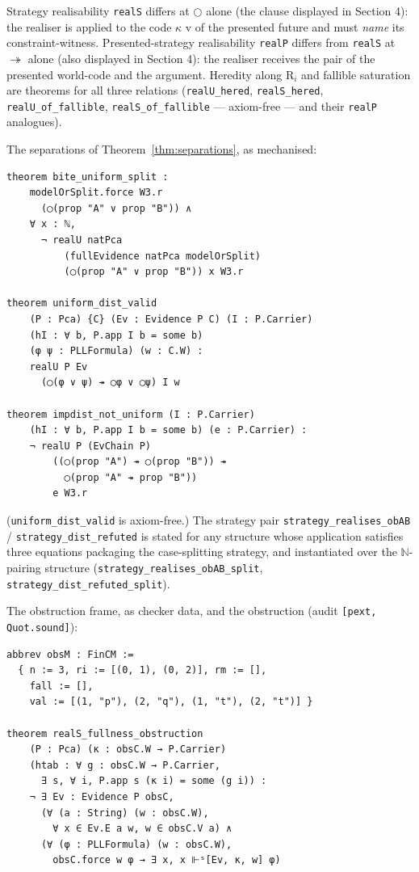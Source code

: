 Strategy realisability \texttt{realS} differs at \ensuremath{\bigcirc} alone
(the clause displayed in Section 4): the realiser is applied to the
code \ensuremath{\kappa} v of the presented future and must \emph{name} its
constraint-witness. Presented-strategy realisability \texttt{realP}
differs from \texttt{realS} at \ensuremath{\twoheadrightarrow} alone (also displayed in
Section 4): the realiser receives the pair of the presented world-code
and the argument. Heredity along R\ensuremath{{}_{i}} and fallible saturation are
theorems for all three relations (\texttt{realU\_hered},
\texttt{realS\_hered}, \texttt{realU\_of\_fallible},
\texttt{realS\_of\_fallible} — axiom-free — and their \texttt{realP}
analogues).

The separations of Theorem~\ref{thm:separations}, as mechanised:

\begin{lstlisting}
theorem bite_uniform_split :
    modelOrSplit.force W3.r
      (◯(prop "A" ∨ prop "B")) ∧
    ∀ x : ℕ,
      ¬ realU natPca
          (fullEvidence natPca modelOrSplit)
          (◯(prop "A" ∨ prop "B")) x W3.r

theorem uniform_dist_valid
    (P : Pca) {C} (Ev : Evidence P C) (I : P.Carrier)
    (hI : ∀ b, P.app I b = some b)
    (φ ψ : PLLFormula) (w : C.W) :
    realU P Ev
      (◯(φ ∨ ψ) ↠ ◯φ ∨ ◯ψ) I w

theorem impdist_not_uniform (I : P.Carrier)
    (hI : ∀ b, P.app I b = some b) (e : P.Carrier) :
    ¬ realU P (EvChain P)
        ((◯(prop "A") ↠ ◯(prop "B")) ↠
          ◯(prop "A" ↠ prop "B"))
        e W3.r
\end{lstlisting}

\noindent (\texttt{uniform\_dist\_valid} is axiom-free.) The strategy
pair \texttt{strategy\_realises\_obAB} / \texttt{strategy\_dist\_refuted}
is stated for any structure whose application satisfies three equations
packaging the case-splitting strategy, and instantiated over the
\ensuremath{\mathbb{N}}-pairing structure
(\texttt{strategy\_realises\_obAB\_split},
\texttt{strategy\_dist\_refuted\_split}).

The obstruction frame, as checker data, and the obstruction
(audit \texttt{[pext, Quot.sound]}):

\begin{lstlisting}
abbrev obsM : FinCM :=
  { n := 3, ri := [(0, 1), (0, 2)], rm := [],
    fall := [],
    val := [(1, "p"), (2, "q"), (1, "t"), (2, "t")] }

theorem realS_fullness_obstruction
    (P : Pca) (κ : obsC.W → P.Carrier)
    (htab : ∀ g : obsC.W → P.Carrier,
      ∃ s, ∀ i, P.app s (κ i) = some (g i)) :
    ¬ ∃ Ev : Evidence P obsC,
      (∀ (a : String) (w : obsC.W),
        ∀ x ∈ Ev.E a w, w ∈ obsC.V a) ∧
      (∀ (φ : PLLFormula) (w : obsC.W),
        obsC.force w φ → ∃ x, x ⊩ˢ[Ev, κ, w] φ)
\end{lstlisting}

